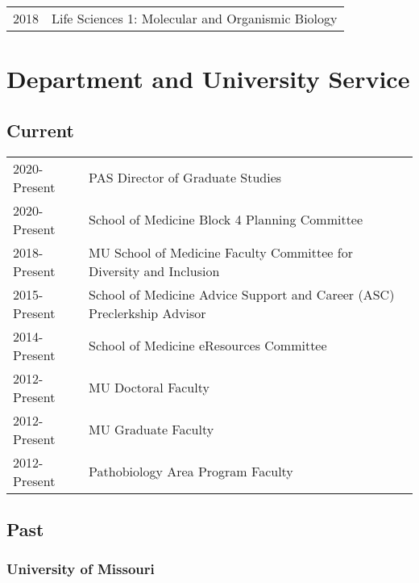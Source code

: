\documentclass[10pt,letterpaper,]{article}
\begin{document}
\begin{tabular}{ll}
  2018 & Life Sciences 1: Molecular and Organismic Biology \\ 
  \end{tabular}

\hypertarget{department-and-university-service}{%
\section{Department and University
Service}\label{department-and-university-service}}

\hypertarget{current-1}{%
\subsection{Current}\label{current-1}}

\begin{tabular}{ll}
  2020-Present & PAS Director of Graduate Studies \\ 
  2020-Present & School of Medicine Block 4 Planning Committee \\ 
  2018-Present & MU School of Medicine Faculty Committee for Diversity and Inclusion \\ 
  2015-Present & School of Medicine Advice Support and Career (ASC) Preclerkship Advisor \\ 
  2014-Present & School of Medicine eResources Committee \\ 
  2012-Present & MU Doctoral Faculty \\ 
  2012-Present & MU Graduate Faculty \\ 
  2012-Present & Pathobiology Area Program Faculty \\ 
  \end{tabular}

\hypertarget{past-1}{%
\subsection{Past}\label{past-1}}

\hypertarget{university-of-missouri-1}{%
\subsubsection{University of Missouri}\label{university-of-missouri-1}}
\end{document}
